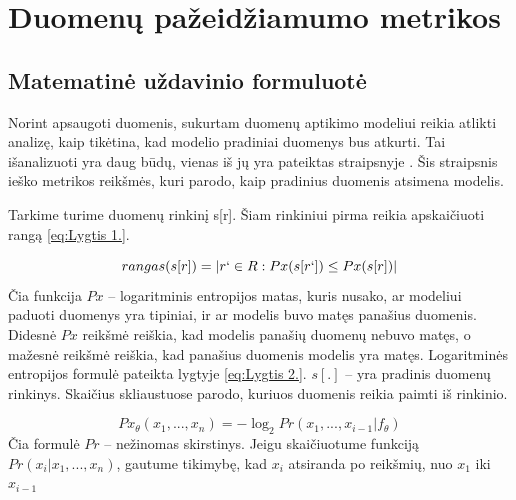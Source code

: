 \documentclass{VUMIFInfBakalaurinis}
\begin{document}




\section{Duomenų pažeidžiamumo metrikos}

\subsection{Matematinė uždavinio formuluotė}
\par Norint apsaugoti duomenis, sukurtam duomenų aptikimo modeliui reikia atlikti analizę, kaip tikėtina, kad modelio pradiniai duomenys bus atkurti. Tai išanalizuoti yra daug būdų, vienas iš jų yra pateiktas straipsnyje \cite{11}.
 Šis straipsnis ieško metrikos reikšmės, kuri parodo, kaip pradinius duomenis atsimena modelis.
\par Tarkime turime duomenų rinkinį s[r]. Šiam rinkiniui pirma reikia apskaičiuoti rangą \eqref{eq:Lygtis 1.}.

\begin{equation}
rangas(s[r]) = | {r` \in R : Px(s[r`]) \leq Px(s[r])} |
\label{eq:Lygtis 1.}
\end{equation}
Čia funkcija $Px$ -- logaritminis entropijos matas, kuris nusako, ar modeliui paduoti duomenys yra tipiniai, ir ar modelis buvo matęs panašius duomenis. Didesnė $Px$ reikšmė reiškia, kad modelis panašių duomenų nebuvo matęs, o mažesnė reikšmė reiškia, kad panašius duomenis modelis yra matęs. Logaritminės entropijos formulė pateikta lygtyje \eqref{eq:Lygtis 2.}. $s[.]$ -- yra pradinis duomenų rinkinys. Skaičius skliaustuose parodo, kuriuos duomenis reikia paimti iš rinkinio.

\begin{equation}
Px_{\theta}(x_{1}, ..., x_{n}) = -\log_{2} Pr(x_{1}, ..., x_{i - 1} | f_{\theta})
\label{eq:Lygtis 2.}
\end{equation}
Čia formulė $Pr$ -- nežinomas skirstinys. Jeigu skaičiuotume funkciją $Pr(x_{i} | x_{1}, ..., x_{n})$, gautume tikimybę, kad $x_{i}$ atsiranda po reikšmių, nuo $x_{1}$ iki $x_{i-1}$
\end{document}
